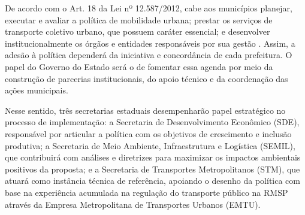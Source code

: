 De acordo com o Art. 18 da Lei nº 12.587/2012, cabe aos municípios planejar, executar e avaliar a política de mobilidade urbana; prestar os serviços de transporte coletivo urbano, que possuem caráter essencial; e desenvolver institucionalmente os órgãos e entidades responsáveis por sua gestão \cite{lei12587}. Assim, a adesão à política dependerá da iniciativa e concordância de cada prefeitura. O papel do Governo do Estado será o de fomentar essa agenda por meio da construção de parcerias institucionais, do apoio técnico e da coordenação das ações municipais.

Nesse sentido, três secretarias estaduais desempenharão papel estratégico no processo de implementação: a Secretaria de Desenvolvimento Econômico (SDE), responsável por articular a política com os objetivos de crescimento e inclusão produtiva; a Secretaria de Meio Ambiente, Infraestrutura e Logística (SEMIL), que contribuirá com análises e diretrizes para maximizar os impactos ambientais positivos da proposta; e a Secretaria de Transportes Metropolitanos (STM), que atuará como instância técnica de referência, apoiando o desenho da política com base na experiência acumulada na regulação do transporte público na RMSP através da Empresa Metropolitana de Transportes Urbanos (EMTU).
